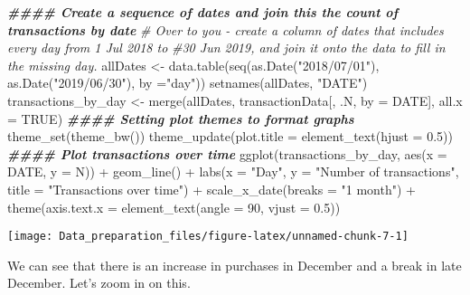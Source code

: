 \documentclass[
]{article}
\newenvironment{Shaded}{\begin{snugshade}}{\end{snugshade}}
\newcommand{\AttributeTok}[1]{\textcolor[rgb]{0.77,0.63,0.00}{#1}}
\newcommand{\CommentTok}[1]{\textcolor[rgb]{0.56,0.35,0.01}{\textit{#1}}}
\newcommand{\ConstantTok}[1]{\textcolor[rgb]{0.00,0.00,0.00}{#1}}
\newcommand{\DecValTok}[1]{\textcolor[rgb]{0.00,0.00,0.81}{#1}}
\newcommand{\DocumentationTok}[1]{\textcolor[rgb]{0.56,0.35,0.01}{\textbf{\textit{#1}}}}
\newcommand{\FloatTok}[1]{\textcolor[rgb]{0.00,0.00,0.81}{#1}}
\newcommand{\FunctionTok}[1]{\textcolor[rgb]{0.00,0.00,0.00}{#1}}
\newcommand{\NormalTok}[1]{#1}
\newcommand{\OtherTok}[1]{\textcolor[rgb]{0.56,0.35,0.01}{#1}}
\newcommand{\SpecialCharTok}[1]{\textcolor[rgb]{0.00,0.00,0.00}{#1}}
\newcommand{\StringTok}[1]{\textcolor[rgb]{0.31,0.60,0.02}{#1}}
\begin{document}
\begin{Shaded}
\begin{Highlighting}[]
\DocumentationTok{\#\#\#\# Create a sequence of dates and join this the count of transactions by date}
\CommentTok{\# Over to you {-} create a column of dates that includes every day from 1 Jul 2018 to}
\CommentTok{\#30 Jun 2019, and join it onto the data to fill in the missing day.}
\NormalTok{allDates }\OtherTok{\textless{}{-}} \FunctionTok{data.table}\NormalTok{(}\FunctionTok{seq}\NormalTok{(}\FunctionTok{as.Date}\NormalTok{(}\StringTok{"2018/07/01"}\NormalTok{), }\FunctionTok{as.Date}\NormalTok{(}\StringTok{"2019/06/30"}\NormalTok{), }\AttributeTok{by =}\StringTok{"day"}\NormalTok{))}
\FunctionTok{setnames}\NormalTok{(allDates, }\StringTok{"DATE"}\NormalTok{)}
\NormalTok{transactions\_by\_day }\OtherTok{\textless{}{-}} \FunctionTok{merge}\NormalTok{(allDates, transactionData[, .N, }\AttributeTok{by =}\NormalTok{ DATE], }\AttributeTok{all.x =} \ConstantTok{TRUE}\NormalTok{)}
\DocumentationTok{\#\#\#\# Setting plot themes to format graphs}
\FunctionTok{theme\_set}\NormalTok{(}\FunctionTok{theme\_bw}\NormalTok{())}
\FunctionTok{theme\_update}\NormalTok{(}\AttributeTok{plot.title =} \FunctionTok{element\_text}\NormalTok{(}\AttributeTok{hjust =} \FloatTok{0.5}\NormalTok{))}
\DocumentationTok{\#\#\#\# Plot transactions over time}
\FunctionTok{ggplot}\NormalTok{(transactions\_by\_day, }\FunctionTok{aes}\NormalTok{(}\AttributeTok{x =}\NormalTok{ DATE, }\AttributeTok{y =}\NormalTok{ N)) }\SpecialCharTok{+}
\FunctionTok{geom\_line}\NormalTok{() }\SpecialCharTok{+}
\FunctionTok{labs}\NormalTok{(}\AttributeTok{x =} \StringTok{"Day"}\NormalTok{, }\AttributeTok{y =} \StringTok{"Number of transactions"}\NormalTok{, }\AttributeTok{title =} \StringTok{"Transactions over time"}\NormalTok{) }\SpecialCharTok{+}
\FunctionTok{scale\_x\_date}\NormalTok{(}\AttributeTok{breaks =} \StringTok{"1 month"}\NormalTok{) }\SpecialCharTok{+}
\FunctionTok{theme}\NormalTok{(}\AttributeTok{axis.text.x =} \FunctionTok{element\_text}\NormalTok{(}\AttributeTok{angle =} \DecValTok{90}\NormalTok{, }\AttributeTok{vjust =} \FloatTok{0.5}\NormalTok{))}
\end{Highlighting}
\end{Shaded}

\begin{center}\texttt{[image: Data\_preparation\_files/figure-latex/unnamed-chunk-7-1]} \end{center}

We can see that there is an increase in purchases in December and a
break in late December. Let's zoom in on this.
\end{document}
